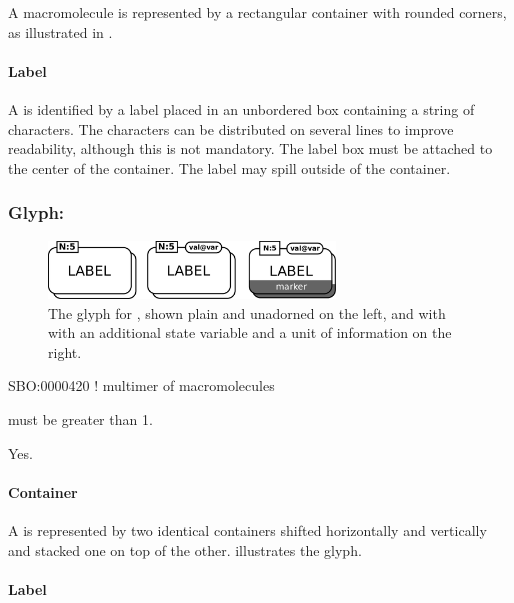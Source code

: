A macromolecule is represented by a rectangular container with rounded
corners, as illustrated in .

\paragraph{Label}

A  is identified by a label placed in an unbordered box containing a string of characters.  The characters can be distributed on several lines to improve readability, although this is not mandatory.  The label box must be attached to the center of the container.  The label may spill outside of the container.

\subsubsection{Glyph: }

\begin{figure}[H]
  \centering
  \includegraphics[width = 3.0in]{images/macromolMultimer}
  \caption{The \PD glyph for , shown plain and
    unadorned on the left, and with with an additional state variable and a
    unit of information on the right.}
  \label{fig:macromolMultimer}
\end{figure}

\begin{glyphDescription}
\glyphSboTerm SBO:0000420 ! multimer of macromolecules
\glyphAux 
\glyphRules%
\begin{inparaenum}
\item {} must be greater than 1.
\end{inparaenum}
\glyphCloning Yes.
\end{glyphDescription}

\paragraph{Container}

A  is represented by two identical containers shifted horizontally and vertically and stacked one on top of the other.   illustrates the glyph.

\paragraph{Label}

